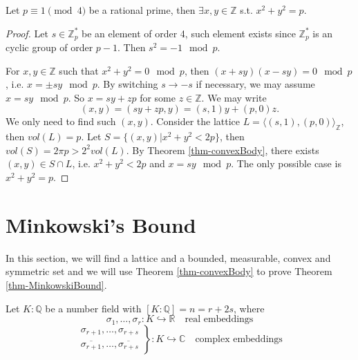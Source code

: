 \begin{example}
    Let $p\equiv1 \pmod 4$ be a rational prime, then $\exists x,y\in \mathbb{Z}$ s.t. $x^{2}+y^{2}=p$. 
    \begin{proof}
        Let $s\in \mathbb{Z}_{p}^{*}$ be an element of order 4, such element exists since $\mathbb{Z}_{p}^{*}$ is an cyclic group of order $p-1$. Then $s^{2}=-1 \mod p$. 

        For $x,y \in \mathbb{Z}$ such that $x^{2}+y^{2}=0 \mod p$, then $(x+sy)(x-sy)=0\mod p$, i.e. $x=\pm sy\mod p$. By switching $s\to -s$ if necessary, we may assume $x=sy\mod p$. So $x=sy+zp$ for some $z\in \mathbb{Z}$. We may write 
        \[
        (x,y)=(sy+zp,y)=(s,1)y+(p,0)z. 
        \]
        We only need to find such $(x,y)$. 
        Consider the lattice $L=\langle (s,1),(p,0)\rangle_{\mathbb{Z}}$, then $vol(L)=p$. Let $S=\{(x,y)|x^{2}+y^{2}<2p\}$, then $vol(S)=2\pi p>2^{2}vol(L)$. By Theorem \ref{thm-convexBody}, there exists $(x,y)\in S\cap L$, i.e. $x^{2}+y^{2}<2p$ and $x=sy\mod p$. The only possible case is $x^{2}+y^{2}=p$. 
    \end{proof}
\end{example}

\section{Minkowski's Bound} \label{sec-minkowski}
In this section, we will find a lattice and a bounded, measurable, convex and symmetric set and we will use Theorem \ref{thm-convexBody} to prove Theorem \ref{thm-MinkowskiBound}. 

Let $K:\mathbb{Q}$ be a number field with $[K:\mathbb{Q}]=n=r+2s$, where 
\[
\sigma_{1},\dots, \sigma_{r}:K\hookrightarrow\mathbb{R} \quad\text{real embeddings}
\]
\[
\left.\begin{aligned}
    \sigma_{r+1},\dots, \sigma_{r+s}\\
    \overline{\sigma_{r+1}},\dots, \overline{\sigma_{r+s}}
\end{aligned}\right\}:K\hookrightarrow \mathbb{C}\quad \text{complex embeddings}
\]

